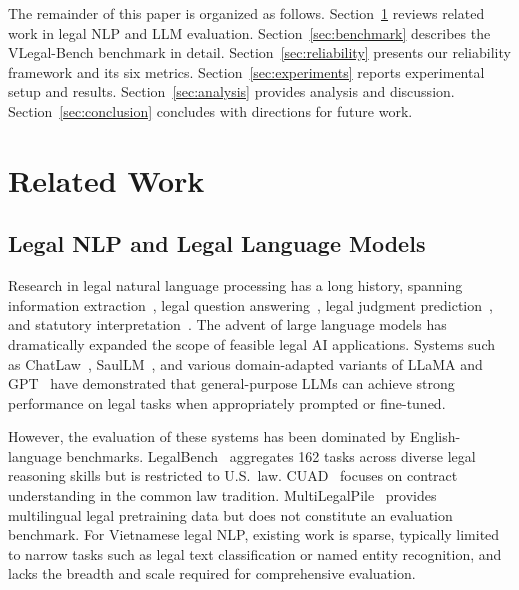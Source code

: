 \documentclass[11pt,a4paper]{article}
\newcommand{\system}{VLegal-Bench}
\begin{document}
The remainder of this paper is organized as follows.
Section~\ref{sec:related_work} reviews related work in legal NLP and LLM evaluation.
Section~\ref{sec:benchmark} describes the \system{} benchmark in detail.
Section~\ref{sec:reliability} presents our reliability framework and its six metrics.
Section~\ref{sec:experiments} reports experimental setup and results.
Section~\ref{sec:analysis} provides analysis and discussion.
Section~\ref{sec:conclusion} concludes with directions for future work.

\section{Related Work}
\label{sec:related_work}

\subsection{Legal NLP and Legal Language Models}

Research in legal natural language processing has a long history, spanning information extraction~\citep{lespagnol2018judicial}, legal question answering~\citep{zhhong+2023j1,li2023scalable}, legal judgment prediction~\citep{aletras2016predicting,medvedeva2019judicial}, and statutory interpretation~\citep{chalkidis2020legal}.
The advent of large language models has dramatically expanded the scope of feasible legal AI applications.
Systems such as ChatLaw~\citep{cui2023chatlaw}, SaulLM~\citep{colombo2024saullm}, and various domain-adapted variants of LLaMA and GPT~\citep{cui2023chatlaw,huang2023law} have demonstrated that general-purpose LLMs can achieve strong performance on legal tasks when appropriately prompted or fine-tuned.

However, the evaluation of these systems has been dominated by English-language benchmarks.
LegalBench~\citep{guha2023legalbench} aggregates 162 tasks across diverse legal reasoning skills but is restricted to U.S.~law.
CUAD~\citep{hendrycks2021cuad} focuses on contract understanding in the common law tradition.
MultiLegalPile~\citep{niklaus2023multilegalpile} provides multilingual legal pretraining data but does not constitute an evaluation benchmark.
For Vietnamese legal NLP, existing work is sparse, typically limited to narrow tasks such as legal text classification or named entity recognition, and lacks the breadth and scale required for comprehensive evaluation.
\end{document}
